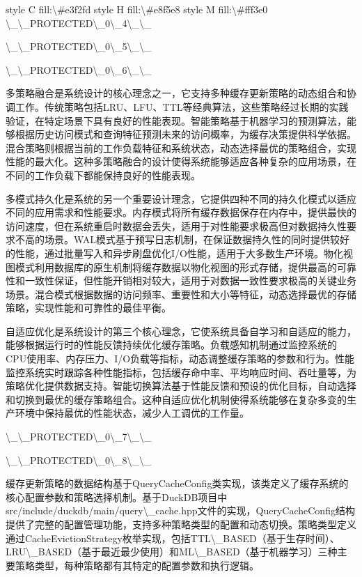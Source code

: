     style C fill:\textbackslash{}#e3f2fd
    style H fill:\textbackslash{}#e8f5e8
    style M fill:\textbackslash{}#fff3e0
\textbackslash{}_\textbackslash{}_PROTECTED\textbackslash{}_0\textbackslash{}_4\textbackslash{}_\textbackslash{}_

\textbackslash{}_\textbackslash{}_PROTECTED\textbackslash{}_0\textbackslash{}_5\textbackslash{}_\textbackslash{}_

\textbackslash{}_\textbackslash{}_PROTECTED\textbackslash{}_0\textbackslash{}_6\textbackslash{}_\textbackslash{}_

多策略融合是系统设计的核心理念之一，它支持多种缓存更新策略的动态组合和协调工作。传统策略包括LRU、LFU、TTL等经典算法，这些策略经过长期的实践验证，在特定场景下具有良好的性能表现。智能策略基于机器学习的预测算法，能够根据历史访问模式和查询特征预测未来的访问概率，为缓存决策提供科学依据。混合策略则根据当前的工作负载特征和系统状态，动态选择最优的策略组合，实现性能的最大化。这种多策略融合的设计使得系统能够适应各种复杂的应用场景，在不同的工作负载下都能保持良好的性能表现。

多模式持久化是系统的另一个重要设计理念，它提供四种不同的持久化模式以适应不同的应用需求和性能要求。内存模式将所有缓存数据保存在内存中，提供最快的访问速度，但在系统重启时数据会丢失，适用于对性能要求极高但对数据持久性要求不高的场景。WAL模式基于预写日志机制，在保证数据持久性的同时提供较好的性能，通过批量写入和异步刷盘优化I/O性能，适用于大多数生产环境。物化视图模式利用数据库的原生机制将缓存数据以物化视图的形式存储，提供最高的可靠性和一致性保证，但性能开销相对较大，适用于对数据一致性要求极高的关键业务场景。混合模式根据数据的访问频率、重要性和大小等特征，动态选择最优的存储策略，实现性能和可靠性的最佳平衡。

自适应优化是系统设计的第三个核心理念，它使系统具备自学习和自适应的能力，能够根据运行时的性能反馈持续优化缓存策略。负载感知机制通过监控系统的CPU使用率、内存压力、I/O负载等指标，动态调整缓存策略的参数和行为。性能监控系统实时跟踪各种性能指标，包括缓存命中率、平均响应时间、吞吐量等，为策略优化提供数据支持。智能切换算法基于性能反馈和预设的优化目标，自动选择和切换到最优的缓存策略组合。这种自适应优化机制使得系统能够在复杂多变的生产环境中保持最优的性能状态，减少人工调优的工作量。

\textbackslash{}_\textbackslash{}_PROTECTED\textbackslash{}_0\textbackslash{}_7\textbackslash{}_\textbackslash{}_

\textbackslash{}_\textbackslash{}_PROTECTED\textbackslash{}_0\textbackslash{}_8\textbackslash{}_\textbackslash{}_

缓存更新策略的数据结构基于QueryCacheConfig类实现，该类定义了缓存系统的核心配置参数和策略选择机制。基于DuckDB项目中src/include/duckdb/main/query\textbackslash{}_cache.hpp文件的实现，QueryCacheConfig结构提供了完整的配置管理功能，支持多种策略类型的配置和动态切换。策略类型定义通过CacheEvictionStrategy枚举实现，包括TTL\textbackslash{}_BASED（基于生存时间）、LRU\textbackslash{}_BASED（基于最近最少使用）和ML\textbackslash{}_BASED（基于机器学习）三种主要策略类型，每种策略都有其特定的配置参数和执行逻辑。

